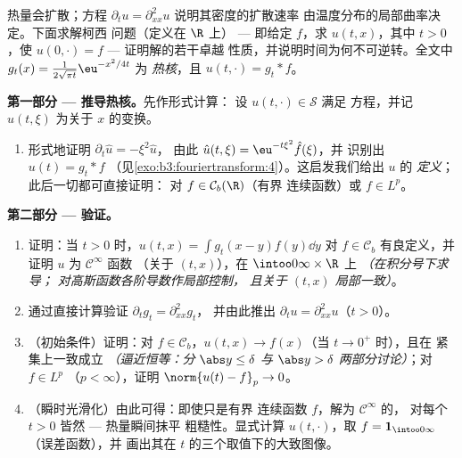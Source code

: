 \begin{problem}[{周末问题 --- $\partial_tu =
\partial^2_{xx}u$，从头到尾求解}]
\label{pb:b3:fouriertransform:1}
热量会扩散；方程 $\partial_tu = \partial_{xx}^2u$
说明其密度的扩散速率
由温度分布的局部曲率决定。下面求解柯西
问题（定义在 $\R$ 上） --- 即给定 $f$，求 $u(t, x)$，其中 $t > 0$，使
$u(0, \cdot) = f$ --- 证明解的若干卓越
性质，并说明时间为何不可逆转。全文中
$g_t(x) = \frac1{2\sqrt{\pi t}}\eu^{-x^2/4t}$ 为
\emph{热核}，且 $u(t, \cdot) = g_t *
f$。

\medskip
\noindent\textbf{第一部分 --- 推导热核。}先作形式计算：
设 $u(t, \cdot) \in \mathcal S$ 满足
方程，并记 $\hat u(t, \xi)$ 为关于
$x$ 的变换。
\begin{enumerate}
  \item 形式地证明 $\partial_t\hat u = -\xi^2\hat u$，
        由此 $\hat u(t,\xi) = \eu^{-t\xi^2}\hat f(\xi)$，并
        识别出 $u(t) = g_t * f$
        （见\cref{exo:b3:fouriertransform:4}）。这启发我们给出 $u$ 的
        \emph{定义}；此后一切都可直接证明：
        对 $f \in \mathcal C_b(\R)$（有界
        连续函数）或 $f \in L^p$。
\end{enumerate}

\medskip
\noindent\textbf{第二部分 --- 验证。}
\begin{enumerate}[resume]
  \item 证明：当 $t > 0$ 时，$u(t, x) = \int
        g_t(x-y)f(y)\dd y$ 对 $f \in \mathcal
        C_b$ 有良定义，并证明 $u$ 为 $\mathcal C^\infty$ 函数
        （关于 $(t, x)$），在 $\intoo0\infty\times\R$ 上 \emph{（在积分号下求导；
        对高斯函数各阶导数作局部控制，
        且关于 $(t,x)$ 局部一致）}。
  \item 通过直接计算验证 $\partial_tg_t = \partial^2_{xx}g_t$，
        并由此推出 $\partial_tu =
        \partial^2_{xx}u$（$t > 0$）。
  \item （初始条件）证明：对 $f \in \mathcal
        C_b$，$u(t, x) \to f(x)$（当 $t \to 0^+$ 时），且在
        紧集上一致成立 \emph{（逼近恒等：分 $\abs y
        \leq \delta$ 与 $\abs y > \delta$ 两部分讨论）}；对 $f \in L^p$
        （$p < \infty$），证明 $\norm{u(t) - f}_p \to 0$。
  \item （瞬时光滑化）由此可得：即使只是有界
        连续函数 $f$，解为 $\mathcal C^\infty$ 的，
        对每个 $t > 0$ 皆然 --- 热量瞬间抹平
        粗糙性。显式计算 $u(t, \cdot)$，取 $f =
        \mathbf 1_{\intoo0\infty}$（误差函数），并
        画出其在 $t$ 的三个取值下的大致图像。
\end{enumerate}


\end{problem}
